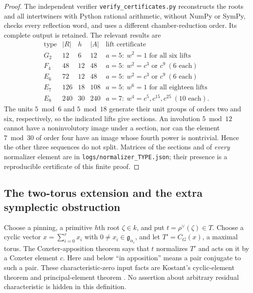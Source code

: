 \begin{proof}
The independent verifier \texttt{verify\_certificates.py} reconstructs
the roots and all intertwiners with Python rational arithmetic, without
NumPy or SymPy, checks every reflection word, and uses a different
chamber-reduction order.  Its complete output is retained.  The relevant
results are
\[
\begin{array}{c|r|r|r|l}
\text{type}&|R|&h&|A|&\text{lift certificate}\\\hline
G_2&12&6&12&a=5:\;w^2=1\text{ for all six lifts}\\
F_4&48&12&48&a=5:\;w^2=c^3\text{ or }c^9\ (6\text{ each})\\
E_6&72&12&48&a=5:\;w^2=c^3\text{ or }c^9\ (6\text{ each})\\
E_7&126&18&108&a=5:\;w^6=1\text{ for all eighteen lifts}\\
E_8&240&30&240&a=7:\;w^4=c^5,c^{15},c^{25}\ (10\text{ each}).
\end{array}
\]
The units $5\bmod6$ and $5\bmod18$ generate their unit groups of
orders two and six, respectively, so the indicated lifts give sections.
An involution $5\bmod12$ cannot have a noninvolutory image under a
section, nor can the element $7\bmod30$ of order four have an image
whose fourth power is nontrivial.  Hence the other three sequences do
not split.  Matrices of the sections and of \emph{every} normalizer
element are in \texttt{logs/normalizer\_TYPE.json}; their presence is a
reproducible certificate of this finite proof.
\end{proof}

\subsection{The two-torus extension and the extra symplectic obstruction}
Choose a pinning, a primitive $h$th root $\zeta\in k$, and put
$t=\rho^\vee(\zeta)\in T$.  Choose a cyclic vector
$x=\sum_{i=0}^r x_i$ with $0\ne x_i\in\mathfrak g_{\alpha_i}$, and
let $T'=C_G(x)$, a maximal torus.  The Coxeter-apposition theorem says
that $t$ normalizes $T'$ and acts on it by a Coxeter element $c$.
Here and below ``in apposition'' means a pair conjugate to such a pair.
These characteristic-zero input facts are Kostant's cyclic-element
theorem and principal-element theorem \cite[\S\S6.2--6.7,
Theorem 8.6]{D-Kostant1959}.  No assertion about arbitrary residual
characteristic is hidden in this definition.

